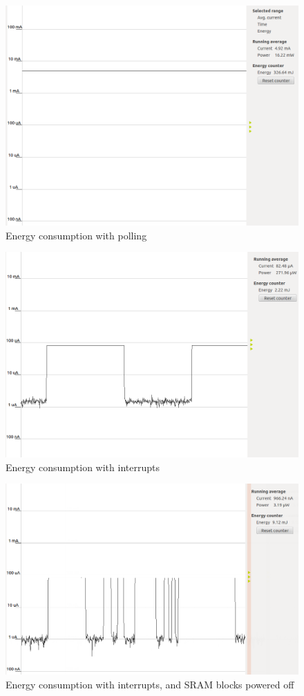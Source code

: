 \begin{figure}[ht]
 \centering
 \includegraphics[width=\textwidth]{images/performance_with_polling.png}
 \caption{Energy consumption with polling}
 \label{fig:PerformancePolling}
\end{figure}

\begin{figure}[ht]
 \centering
 \includegraphics[width=\textwidth]{images/performance_with_interrputs.png}
 \caption{Energy consumption with interrupts}
 \label{fig:PerformanceInterrupts}
\end{figure}

\begin{figure}[ht]
 \centering
 \includegraphics[width=\textwidth]{images/performance_interrupts_sram_idle.png}
 \caption{Energy consumption with interrupts, and SRAM blocks powered off}
 \label{fig:PerformanceSRAM}
\end{figure}
